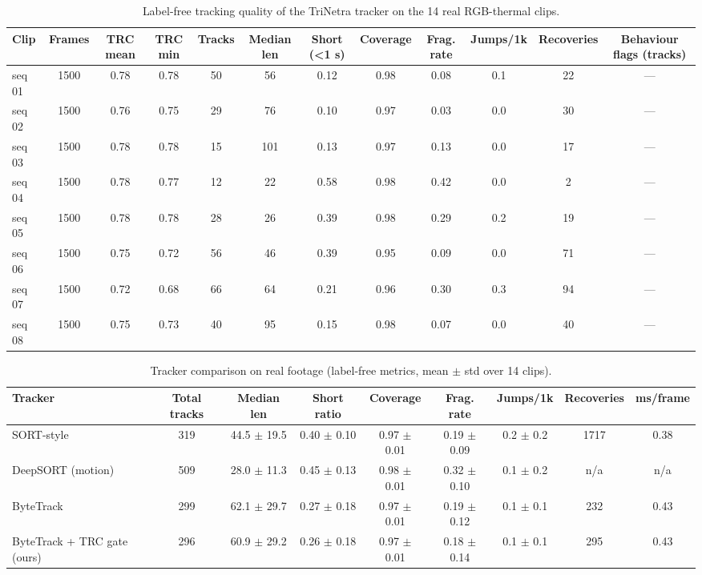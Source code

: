 \begin{table}[t]
\centering
\caption{Label-free tracking quality of the TriNetra tracker on the 14 real RGB-thermal clips.}
\label{tab:real_clips}
\begin{tabular}{lccccccccccc}
\toprule
Clip & Frames & TRC mean & TRC min & Tracks & Median len & Short (<1 s) & Coverage & Frag. rate & Jumps/1k & Recoveries & Behaviour flags (tracks) \\
\midrule
seq 01 & 1500 & 0.78 & 0.78 & 50 & 56 & 0.12 & 0.98 & 0.08 & 0.1 & 22 & — \\
seq 02 & 1500 & 0.76 & 0.75 & 29 & 76 & 0.10 & 0.97 & 0.03 & 0.0 & 30 & — \\
seq 03 & 1500 & 0.78 & 0.78 & 15 & 101 & 0.13 & 0.97 & 0.13 & 0.0 & 17 & — \\
seq 04 & 1500 & 0.78 & 0.77 & 12 & 22 & 0.58 & 0.98 & 0.42 & 0.0 & 2 & — \\
seq 05 & 1500 & 0.78 & 0.78 & 28 & 26 & 0.39 & 0.98 & 0.29 & 0.2 & 19 & — \\
seq 06 & 1500 & 0.75 & 0.72 & 56 & 46 & 0.39 & 0.95 & 0.09 & 0.0 & 71 & — \\
seq 07 & 1500 & 0.72 & 0.68 & 66 & 64 & 0.21 & 0.96 & 0.30 & 0.3 & 94 & — \\
seq 08 & 1500 & 0.75 & 0.73 & 40 & 95 & 0.15 & 0.98 & 0.07 & 0.0 & 40 & — \\
\bottomrule
\end{tabular}
\end{table}

\begin{table}[t]
\centering
\caption{Tracker comparison on real footage (label-free metrics, mean $\pm$ std over 14 clips).}
\label{tab:real_compare}
\begin{tabular}{lcccccccc}
\toprule
Tracker & Total tracks & Median len & Short ratio & Coverage & Frag. rate & Jumps/1k & Recoveries & ms/frame \\
\midrule
SORT-style & 319 & 44.5 $\pm$ 19.5 & 0.40 $\pm$ 0.10 & 0.97 $\pm$ 0.01 & 0.19 $\pm$ 0.09 & 0.2 $\pm$ 0.2 & 1717 & 0.38 \\
DeepSORT (motion) & 509 & 28.0 $\pm$ 11.3 & 0.45 $\pm$ 0.13 & 0.98 $\pm$ 0.01 & 0.32 $\pm$ 0.10 & 0.1 $\pm$ 0.2 & n/a & n/a \\
ByteTrack & 299 & 62.1 $\pm$ 29.7 & 0.27 $\pm$ 0.18 & 0.97 $\pm$ 0.01 & 0.19 $\pm$ 0.12 & 0.1 $\pm$ 0.1 & 232 & 0.43 \\
ByteTrack + TRC gate (ours) & 296 & 60.9 $\pm$ 29.2 & 0.26 $\pm$ 0.18 & 0.97 $\pm$ 0.01 & 0.18 $\pm$ 0.14 & 0.1 $\pm$ 0.1 & 295 & 0.43 \\
\bottomrule
\end{tabular}
\end{table}

